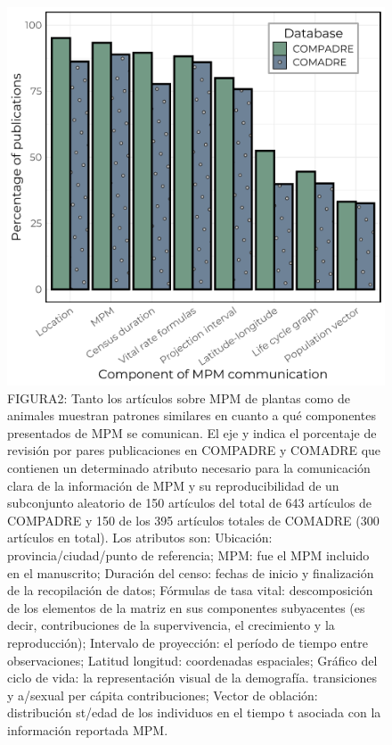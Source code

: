 \documentclass[
]{book}
\theoremstyle{definition}
\theoremstyle{definition}
\theoremstyle{definition}
\theoremstyle{definition}
\theoremstyle{remark}
\begin{document}
\begin{figure}
\centering
\includegraphics{Figures/Database_paper.png}
\caption{FIGURA2: Tanto los artículos sobre MPM de plantas como de animales muestran patrones similares en cuanto a qué componentes presentados de MPM se comunican. El eje y indica el porcentaje de revisión por pares publicaciones en COMPADRE y COMADRE que contienen un determinado atributo necesario para la comunicación clara de la información de MPM y su reproducibilidad de un subconjunto aleatorio de 150 artículos del total de 643 artículos de COMPADRE y 150 de los 395 artículos totales de COMADRE (300 artículos en total). Los atributos son: Ubicación: provincia/ciudad/punto de referencia; MPM: fue el MPM incluido en el manuscrito; Duración del censo: fechas de inicio y finalización de la recopilación de datos; Fórmulas de tasa vital: descomposición de los elementos de la matriz en sus componentes subyacentes (es decir, contribuciones de la supervivencia, el crecimiento y la reproducción); Intervalo de proyección: el período de tiempo entre observaciones; Latitud longitud: coordenadas espaciales; Gráfico del ciclo de vida: la representación visual de la demografía. transiciones y a/sexual per cápita contribuciones; Vector de oblación: distribución st/edad de los individuos en el tiempo t asociada con la información reportada MPM.}
\end{figure}
\end{document}
